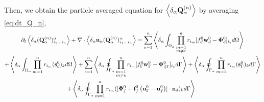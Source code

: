 
Then, we obtain the particle averaged equation for $\left<\delta_\alpha \textbf{Q}_\alpha^{(n)}\right>$ by averaging \ref{eq:dt_Q_n},
\begin{multline*}
    \partial_t \left<\delta_\alpha (\textbf{Q}_\alpha^{(n)})_{i_1\ldots i_n}^\alpha\right>
    + \mathbf{\nabla}\cdot  \left<\delta_\alpha \textbf{u}_\alpha (\textbf{Q}_\alpha^{(n)})_{i_1\ldots i_n}^\alpha\right>
    = \sum_{e=1}^{n} 
    \left<\delta_\alpha \int_{\Omega_{\alpha}} 
        \prod^{n}_{\substack{ m=1 \\m \neq e}} r_{i_m} [f_d^0\textbf{w}_d^0  - \bm\Phi_d^0]_{i_e}
     d\Omega\right>\\
    + \left<\delta_\alpha \int_{\Omega_{\alpha}}  \prod_{m=1}^{n} r_{i_m} (\textbf{s}_d^0)_k  d\Omega\right>
    +     
    \sum_{e=1}^{n} 
    \left<\delta_\alpha \oint_{\Gamma_{\alpha}} 
        \prod^{n}_{\substack{ m=1 \\m \neq e}} r_{i_m} [f_\Gamma^0\textbf{w}_\Gamma^0 - \bm\Phi_{||\Gamma}^0]_{i_e}
     d\Gamma\right>
    + \left<\delta_\alpha \oint_{\Gamma_{\alpha}}  \prod_{m=1}^{n} r_{i_m} (\textbf{s}_\Gamma^0)_k  d\Gamma\right>\\
    +\left<\delta_\alpha \oint_{\Gamma_{\alpha}}  \prod_{m=1}^{n} r_{i_m} ([\bm\Phi_f^0 + \textbf{f}_f^0 \left(\textbf{u}_\Gamma^0 - \textbf{u}_f^0\right)]\cdot \textbf{n}_d)_k  d\Gamma\right>. 
\end{multline*}

